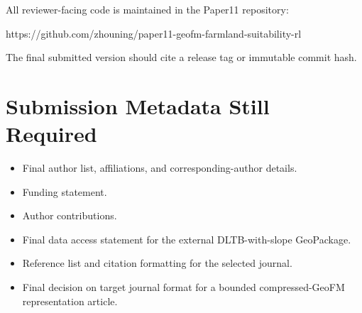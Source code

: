 \documentclass[
  11pt,
  a4paper,
]{article}
\newenvironment{Shaded}{}{}
\newcommand{\NormalTok}[1]{#1}
\providecommand{\tightlist}{%
  \setlength{\itemsep}{0pt}\setlength{\parskip}{0pt}}
\begin{document}
All reviewer-facing code is maintained in the Paper11 repository:

\begin{Shaded}
\begin{Highlighting}[]
\NormalTok{https://github.com/zhouning/paper11{-}geofm{-}farmland{-}suitability{-}rl}
\end{Highlighting}
\end{Shaded}

The final submitted version should cite a release tag or immutable
commit hash.

\section{Submission Metadata Still
Required}\label{submission-metadata-still-required}

\begin{itemize}
\tightlist
\item
  Final author list, affiliations, and corresponding-author details.
\item
  Funding statement.
\item
  Author contributions.
\item
  Final data access statement for the external DLTB-with-slope
  GeoPackage.
\item
  Reference list and citation formatting for the selected journal.
\item
  Final decision on target journal format for a bounded compressed-GeoFM
  representation article.
\end{itemize}
\end{document}
